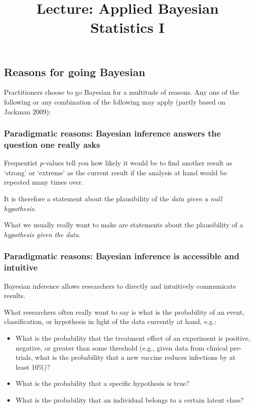 \documentclass[
  11pt,
]{article}
\title{Lecture: Applied Bayesian Statistics I}
\author{}
\date{\vspace{-2.5em}}
\providecommand{\tightlist}{%
  \setlength{\itemsep}{0pt}\setlength{\parskip}{0pt}}
\begin{document}
\maketitle

\hypertarget{reasons-for-going-bayesian}{%
\subsection{Reasons for going Bayesian}\label{reasons-for-going-bayesian}}

Practitioners choose to go Bayesian for a multitude of reasons. Any one
of the following or any combination of the following may apply (partly
based on Jackman 2009):

\hypertarget{paradigmatic-reasons-bayesian-inference-answers-the-question-one-really-asks}{%
\subsubsection{Paradigmatic reasons: Bayesian inference answers the question one really asks}\label{paradigmatic-reasons-bayesian-inference-answers-the-question-one-really-asks}}

Frequentist \(p\)-values tell you how likely it would be to find another
result as `strong' or `extreme' as the current result if the analysis at
hand would be repeated many times over.

It is therefore a statement about the plausibility of the \emph{data given a
null hypothesis}.

What we usually really want to make are statements about the
plausibility of a \emph{hypothesis given the data}.

\hypertarget{paradigmatic-reasons-bayesian-inference-is-accessible-and-intuitive}{%
\subsubsection{Paradigmatic reasons: Bayesian inference is accessible and intuitive}\label{paradigmatic-reasons-bayesian-inference-is-accessible-and-intuitive}}

Bayesian inference allows researchers to directly and intuitively
communicate results.

What researchers often really want to say is what is the probability of
an event, classification, or hypothesis in light of the data currently
at hand, e.g.:

\begin{itemize}
\tightlist
\item
  What is the probability that the treatment effect of an experiment
  is positive, negative, or greater than some threshold (e.g., given
  data from clinical pre-trials, what is the probability that a new
  vaccine reduces infections by at least 10\%)?
\item
  What is the probability that a specific hypothesis is true?
\item
  What is the probability that an individual belongs to a certain
  latent class?
\end{itemize}
\end{document}
